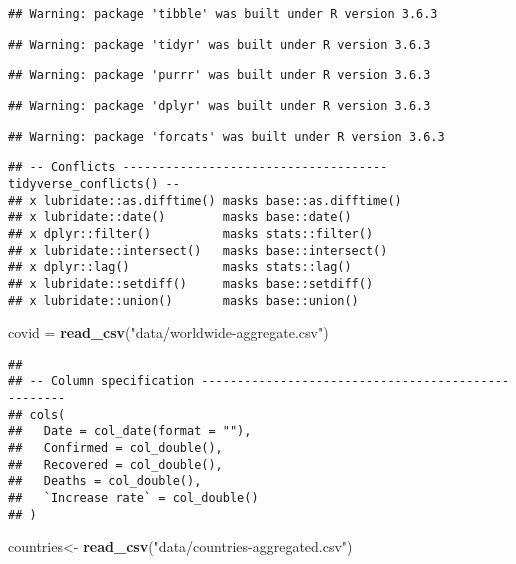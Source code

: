 \documentclass[]{article}
\newenvironment{Shaded}{\begin{snugshade}}{\end{snugshade}}
\newcommand{\KeywordTok}[1]{\textcolor[rgb]{0.13,0.29,0.53}{\textbf{#1}}}
\newcommand{\NormalTok}[1]{#1}
\newcommand{\StringTok}[1]{\textcolor[rgb]{0.31,0.60,0.02}{#1}}
\begin{document}
\begin{verbatim}
## Warning: package 'tibble' was built under R version 3.6.3
\end{verbatim}

\begin{verbatim}
## Warning: package 'tidyr' was built under R version 3.6.3
\end{verbatim}

\begin{verbatim}
## Warning: package 'purrr' was built under R version 3.6.3
\end{verbatim}

\begin{verbatim}
## Warning: package 'dplyr' was built under R version 3.6.3
\end{verbatim}

\begin{verbatim}
## Warning: package 'forcats' was built under R version 3.6.3
\end{verbatim}

\begin{verbatim}
## -- Conflicts ------------------------------------- tidyverse_conflicts() --
## x lubridate::as.difftime() masks base::as.difftime()
## x lubridate::date()        masks base::date()
## x dplyr::filter()          masks stats::filter()
## x lubridate::intersect()   masks base::intersect()
## x dplyr::lag()             masks stats::lag()
## x lubridate::setdiff()     masks base::setdiff()
## x lubridate::union()       masks base::union()
\end{verbatim}

\begin{Shaded}
\begin{Highlighting}[]
\NormalTok{covid =}\StringTok{ }\KeywordTok{read_csv}\NormalTok{(}\StringTok{"data/worldwide-aggregate.csv"}\NormalTok{)}
\end{Highlighting}
\end{Shaded}

\begin{verbatim}
## 
## -- Column specification ---------------------------------------------------
## cols(
##   Date = col_date(format = ""),
##   Confirmed = col_double(),
##   Recovered = col_double(),
##   Deaths = col_double(),
##   `Increase rate` = col_double()
## )
\end{verbatim}

\begin{Shaded}
\begin{Highlighting}[]
\NormalTok{countries<-}\StringTok{ }\KeywordTok{read_csv}\NormalTok{(}\StringTok{"data/countries-aggregated.csv"}\NormalTok{)}
\end{Highlighting}
\end{Shaded}
\end{document}
